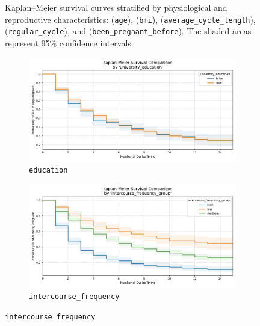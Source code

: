 \documentclass[11pt]{article}
\begin{document}
\begin{figure}[h]
  \caption{
    Kaplan–Meier survival curves stratified by physiological and reproductive characteristics: 
    (\texttt{age}), (\texttt{bmi}), (\texttt{average\_cycle\_length}), 
    (\texttt{regular\_cycle}), and (\texttt{been\_pregnant\_before}). 
    The shaded areas represent 95\% confidence intervals.
  }
  \label{fig:survival_physio}
\end{figure}

\begin{figure}[h]
  \centering
  \begin{subfigure}{0.45\textwidth}
    \includegraphics[width=\linewidth]{plots/survival_comparison_university_education.jpg}
    \caption{\texttt{education}}
  \end{subfigure}
  \hfill
  \begin{subfigure}{0.45\textwidth}
    \includegraphics[width=\linewidth]{plots/survival_comparison_intercourse_frequency_group.jpg}
    \caption{\texttt{intercourse\_frequency}}
  \end{subfigure}

  \vspace{0.3cm}


\end{figure}
\end{document}
